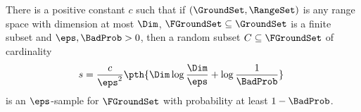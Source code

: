 \begin{theorem}
        There is a positive co\-nstant 
        $c$ such that if
        $(\GroundSet,\RangeSet)$ is any range space with \VC dimension
        at most $\Dim$, $\FGroundSet \subseteq \GroundSet$ is a finite
        subset and $\eps, \BadProb > 0$, then a random subset
        $C\subseteq \FGroundSet$ of cardinality
        \begin{align*}
          s = \frac{c}{\eps^2} \pth{ \Dim \log \frac{\Dim}{\eps} +
          \log\frac{1}{\BadProb}}\
        \end{align*}
        is an $\eps$-sample for $\FGroundSet$ with probability at
        least $1-\BadProb$.                
    \end{theorem}
